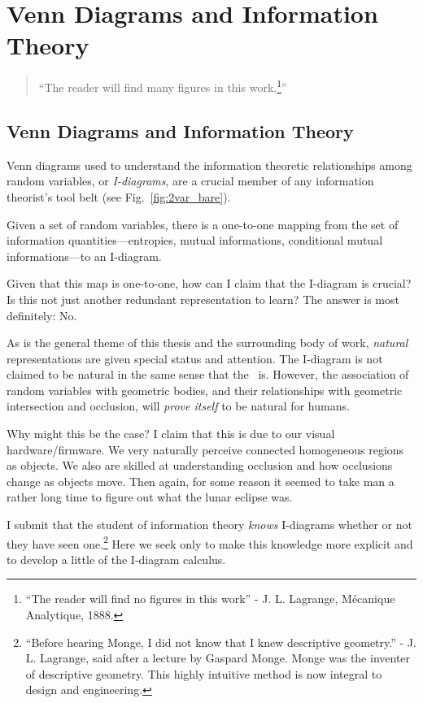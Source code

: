 \ifx\master\undefined\fi


\chapter{Venn Diagrams and Information Theory}
\label{app:Venn}

\begin{quote}
\centering
``The reader will find many figures in this work.\footnote{``The reader will find no figures in this work'' - J. L. Lagrange, M\'{e}canique Analytique, 1888.}''
\end{quote}

\section{Venn Diagrams and Information Theory}

Venn diagrams used to understand the information theoretic relationships among random variables, or \emph{I-diagrams}, are a crucial member of any information theorist's tool belt (see Fig.~\ref{fig:2var_bare}).

Given a set of random variables, there is a one-to-one mapping from the set of information quantities---entropies, mutual informations, conditional mutual informations---to an I-diagram.

Given that this map is one-to-one, how can I claim that the I-diagram is crucial? Is this not just another redundant representation to learn? The answer is most definitely: No.

As is the general theme of this thesis and the surrounding body of work, \emph{natural} representations are given special status and attention. The I-diagram is not claimed to be natural in the same sense that the \eM\ is. However, the association of random variables with geometric bodies, and their relationships with geometric intersection and occlusion, will \emph{prove itself} to be natural for humans.

Why might this be the case? I claim that this is due to our visual hardware/firmware. We very naturally perceive connected homogeneous regions as objects. We also are skilled at understanding occlusion and how occlusions change as objects move. Then again, for some reason it seemed to take man a rather long time to figure out what the lunar eclipse was.

I submit that the student of information theory \emph{knows} I-diagrams whether or not they have seen one.\footnote{``Before hearing Monge, I did not know that I knew descriptive geometry.'' - J. L. Lagrange, said after a lecture by Gaspard Monge. Monge was the inventer of descriptive geometry. This highly intuitive method is now integral to design and engineering.} Here we seek only to make this knowledge more explicit and to develop a little of the I-diagram calculus.


